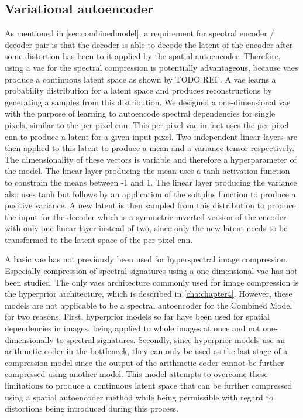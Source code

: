 \subsection{Variational autoencoder \label{sec:vae}}
As mentioned in \autoref{sec:combinedmodel}, a requirement for spectral encoder / decoder pair is that the decoder is able to decode the latent of the encoder after some distortion  has been to it applied by the spatial autoencoder. Therefore, using a \ac{vae} for the spectral compression is potentially advantageous, because \acp{vae} produce a continuous latent space as shown by TODO REF. A \ac{vae} learns a probability distribution for a latent space and produces reconstructions by generating a samples from this distribution. We designed a one-dimensional \ac{vae} with the purpose of learning to autoencode spectral dependencies for single pixels, similar to the per-pixel \ac{cnn}. This per-pixel \ac{vae} in fact uses the per-pixel \ac{cnn} to produce a latent for a given input pixel. Two independent linear layers are then applied to this latent to produce a mean and a variance tensor respectively. The dimensionality of these vectors is variable and therefore a hyperparameter of the model. The linear layer producing the mean uses a tanh activation function to constrain the means between -1 and 1. The linear layer producing the variance also uses tanh but follows by an application of the softplus function to produce a positive variance. A new latent is then sampled from this distribution to produce the input for the decoder which is a symmetric inverted version of the encoder with only one linear layer instead of two, since only the new latent needs to be transformed to the latent space of the per-pixel \ac{cnn}.

A basic \ac{vae} has not previously been used for hyperspectral image compression. Especially compression of spectral signatures using a one-dimensional \ac{vae} has not been studied. The only \acp{vae} architecture commonly used for image compression is the hyperprior architecture, which is described in \autoref{cha:chapter4}. However, these models are not applicable to be a spectral autoencoder for the Combined Model for two reasons. First, hyperprior models so far have been used for spatial dependencies in images, being applied to whole images at once and not one-dimensionally to spectral signatures. Secondly, since hyperprior models use an arithmetic coder in the bottleneck, they can only be used as the last stage of a compression model since the output of the arithmetic coder cannot be further compressed using another model. This model attempts to overcome these limitations to produce a continuous latent space that can be further compressed using a spatial autoencoder method while being permissible with regard to distortions being introduced during this process.

